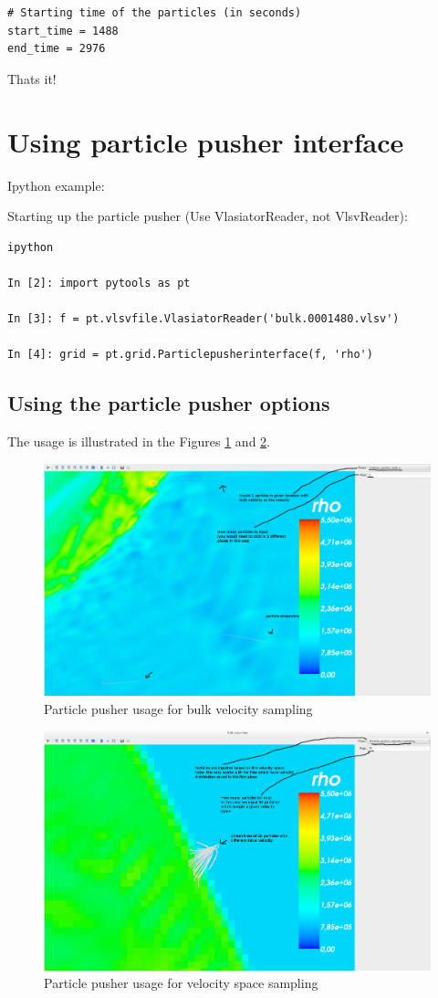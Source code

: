 \documentclass[a4paper,10pt]{article}
\begin{document}
\begin{verbatim}
# Starting time of the particles (in seconds)
start_time = 1488
end_time = 2976
\end{verbatim}

Thats it!

\section{Using particle pusher interface}

Ipython example:

Starting up the particle pusher (Use VlasiatorReader, not VlsvReader):

\begin{verbatim}
ipython

In [2]: import pytools as pt

In [3]: f = pt.vlsvfile.VlasiatorReader('bulk.0001480.vlsv')

In [4]: grid = pt.grid.Particlepusherinterface(f, 'rho')
\end{verbatim}

\subsection{Using the particle pusher options}

The usage is illustrated in the Figures \ref{fig:particle1} and \ref{fig:particle2}.

\begin{figure}[H]
 \centering
 \includegraphics[width=\textwidth]{../images/particlepusherbulk.png}
 \caption{Particle pusher usage for bulk velocity sampling}
 \label{fig:particle1}
\end{figure}

\begin{figure}[H]
 \centering
 \includegraphics[width=\textwidth]{../images/particlepushersampling.png}
 \caption{Particle pusher usage for velocity space sampling}
 \label{fig:particle2}
\end{figure}
\end{document}
